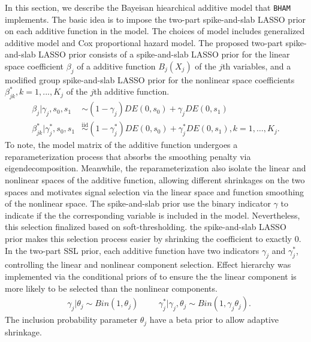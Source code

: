 \documentclass[
]{jss}
\begin{document}
In this section, we describe the Bayeisan hiearchical additive model
that \texttt{BHAM} implements. The basic idea is to impose the two-part
spike-and-slab LASSO prior \cite{guo2022_GAM} on each additive function
in the model. The choices of model includes generalized additive model
and Cox proportional hazard model. The proposed two-part spike-and-slab
LASSO prior consists of a spike-and-slab LASSO prior for the linear
space coefficient \(\beta_j\) of a additive function \(B_j(X_j)\) of the
\(j\)th variables, and a modified group spike-and-slab LASSO prior for
the nonlinear space coefficients \(\beta_{jk}^*, k = 1,..., K_j\) of the
\(j\)th additive function. \begin{align}
  \beta_{j} | \gamma_{j},s_0,s_1 &\sim (1-\gamma_{j}) DE(0, s_0) + \gamma_{j} DE(0, s_1)\nonumber \\
  \beta^*_{jk} | \gamma^*_{j},s_0,s_1 &\overset{\text{iid}}{\sim}(1-\gamma_{j}^*) DE(0, s_0) + \gamma_{j}^*DE(0, s_1), k=1,\dots, K_j.
\end{align} To note, the model matrix of the additive function undergoes
a reparameterization process that absorbs the smoothing penalty via
eigendecomposition. Meanwhile, the reparameterization also isolate the
linear and nonlinear spaces of the additive function, allowing different
shrinkages on the two spaces and motivates signal selection via the
linear space and function smoothing of the nonlinear space. The
spike-and-slab prior use the binary indicator \(\gamma\) to indicate if
the the corresponding variable is included in the model. Nevertheless,
this selection finalized based on soft-thresholding. the spike-and-slab
LASSO prior makes this selection process easier by shrinking the
coefficient to exactly 0. In the two-part SSL prior, each additive
function have two indicators \(\gamma_{j}\) and \(\gamma^*_{j}\),
controlling the linear and nonlinear component selection. Effect
hierarchy was implemented via the conditional priors of to ensure the
the linear component is more likely to be selected than the nonlinear
components. \begin{align}
&\gamma_{j} | \theta_j \sim Bin(1, \theta_j) & & 
&\gamma_{j}^*| \gamma_{j}, \theta_j \sim Bin(1, \gamma_{j}\theta_j).
\end{align} The inclusion probability parameter \(\theta_j\) have a beta
prior to allow adaptive shrinkage.
\end{document}

